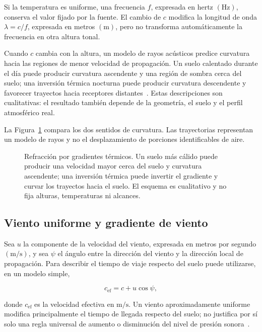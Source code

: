 Si la temperatura es uniforme, una frecuencia \(f\), expresada en hertz
\((\text{Hz})\), conserva el valor fijado por la fuente. El cambio de \(c\)
modifica la longitud de onda \(\lambda=c/f\), expresada en metros
\((\text{m})\), pero no transforma automáticamente la frecuencia en otra
altura tonal.

Cuando \(c\) cambia con la altura, un modelo de rayos acústicos predice
curvatura hacia las regiones de menor velocidad de propagación. Un suelo
calentado durante el día puede producir curvatura ascendente y una región de
sombra cerca del suelo; una inversión térmica nocturna puede producir
curvatura descendente y favorecer trayectos hacia receptores distantes~\cite{xiangBlauert2021,iso9613_1_1993}.
Estas descripciones son cualitativas: el resultado también depende de la
geometría, el suelo y el perfil atmosférico real.

La Figura~\ref{fig:u9-gradientes-termicos} compara los dos sentidos de
curvatura. Las trayectorias representan un modelo de rayos y no el
desplazamiento de porciones identificables de aire.

\begin{figure}[htbp]
    \centering
    
    \caption{Refracción por gradientes térmicos. Un suelo más cálido puede
    producir una velocidad mayor cerca del suelo y curvatura ascendente; una
    inversión térmica puede invertir el gradiente y curvar los trayectos hacia
    el suelo. El esquema es cualitativo y no fija alturas, temperaturas ni
    alcances.}
    \label{fig:u9-gradientes-termicos}
\end{figure}

\subsection{Viento uniforme y gradiente de viento}
\label{sec:u9-viento}

Sea \(u\) la componente de la velocidad del viento, expresada en metros por
segundo \((\text{m}/\text{s})\), y sea \(\psi\) el ángulo entre la dirección
del viento y la dirección local de propagación. Para describir el tiempo de
viaje respecto del suelo puede utilizarse, en un modelo simple,

\begin{equation}
    c_\mathrm{ef}=c+u\cos\psi,
    \label{eq:u9-velocidad-efectiva-viento}
\end{equation}

donde \(c_\mathrm{ef}\) es la velocidad efectiva en
\(\text{m}/\text{s}\). Un viento aproximadamente uniforme modifica
principalmente el tiempo de llegada respecto del suelo; no justifica por sí
solo una regla universal de aumento o disminución del nivel de presión sonora~\cite{xiangBlauert2021,iso9613_1_1993}.

